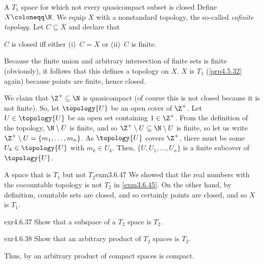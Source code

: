 \begin{exm}{A $T_1$ space for which not every quasicompact subset is closed}{}
Define $X\coloneqq \N$.  We equip $X$ with a nonstandard topology, the so-called \emph{cofinite topology}.  Let $C\subseteq X$ and declare that
\begin{textequation}
$C$ is closed iff either (i)~$C=X$ or (ii)~$C$ is finite.
\end{textequation}
Because the finite union and arbitrary intersection of finite sets is finite (obviously), it follows that this defines a topology on $X$.  $X$ is $T_1$ (\cref{prp4.5.32} again) because points are finite, hence closed.

We claim that $\Z ^+\subseteq \N$ is quasicompact (of course this is not closed because it is not finite).  So, let $\topology{U}$ be an open cover of $\Z ^+$.  Let $U\in \topology{U}$ be an open set containing $1\in \Z ^+$.  From the definition of the topology, $\N \setminus U$ is finite, and so $\Z ^+\setminus U\subseteq \N \setminus U$ is finite, so let us write $\Z ^+\setminus U=\{ m_1,\ldots ,m_n\}$.  As $\topology{U}$ covers $\Z ^+$, there must be some $U_k\in \topology{U}$ with $m_k\in U_k$.  Then, $\{ U,U_1,\ldots ,U_n\}$ is a finite subcover of $\topology{U}$.
\end{exm}
\begin{exm}{A space that is $T_1$ but not $T_2$}{exm3.6.47}
We showed that the real numbers with the cocountable topology is not $T_2$ in \cref{exm3.6.45}.  On the other hand, by definition, countable sets are closed, and so certainly points are closed, and so $X$ is $T_1$.
\end{exm}
\begin{exr}{}{exr4.6.37}
Show that a subspace of a $T_2$ space is $T_2$.
\end{exr}
\begin{exr}{}{exr4.6.38}
Show that an arbitrary product of $T_2$ spaces is $T_2$.
\begin{rmk}
Thus, by  an arbitrary product of compact spaces is compact.
\end{rmk}
\end{exr}

